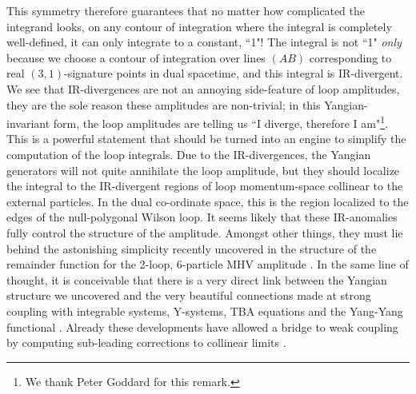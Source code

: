 \documentclass[11pt, reqno]{article}
\begin{document}
This symmetry therefore guarantees that no matter how complicated the integrand looks,
on any contour of integration where the integral is completely
well-defined, it can only integrate to a constant, ``1"!  The integral is not ``1"
{\it only} because we choose a contour of integration over lines $(AB)$ corresponding to real \mbox{$(3,1)$-signature} points in dual spacetime, and this integral is IR-divergent.  We see that IR-divergences are not an annoying side-feature of loop amplitudes, they are the sole reason these amplitudes are non-trivial; in this Yangian-invariant form,  the loop amplitudes are
telling us ``I diverge, therefore I am"\footnote{We thank Peter
Goddard for this remark.}.  This is a powerful statement that should
be turned into an engine to simplify the computation of the loop integrals. Due to the IR-divergences, the
Yangian generators will not quite annihilate the loop amplitude, but they should localize the integral to the IR-divergent regions of loop momentum-space collinear to the external particles. In the
dual co-ordinate space, this is the region localized to the edges of
the null-polygonal Wilson loop.
It seems likely that these IR-anomalies fully control the structure of the amplitude. Amongst other things, they must lie behind the astonishing simplicity recently uncovered in the structure of the remainder function for the 2-loop, 6-particle MHV amplitude \cite{Goncharov:2010jf}. In the same line of thought, it is conceivable that there is a very direct link between the Yangian structure we uncovered and the very beautiful connections made at strong coupling with integrable systems, Y-systems, TBA equations and the Yang-Yang functional \cite{Alday:2009dv,Alday:2010vh}. Already these developments have allowed a bridge to weak coupling by computing sub-leading corrections to collinear limits \cite{Alday:2010ku,Alday:2010zy,Eden:2010zz}.
\end{document}
